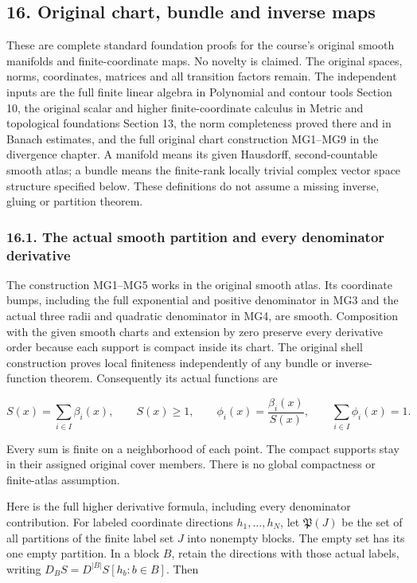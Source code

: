 \documentclass[
  11pt,
]{article}
\begin{document}
\subsection{16. Original chart, bundle and inverse
maps}\label{original-chart-bundle-and-inverse-maps}

These are complete standard foundation proofs for the course's original
smooth manifolds and finite-coordinate maps. No novelty is claimed. The
original spaces, norms, coordinates, matrices and all transition factors
remain. The independent inputs are the full finite linear algebra in
Polynomial and contour tools Section 10, the original scalar and higher
finite-coordinate calculus in Metric and topological foundations Section
13, the norm completeness proved there and in Banach estimates, and the
full original chart construction MG1--MG9 in the divergence chapter. A
manifold means its given Hausdorff, second-countable smooth atlas; a
bundle means the finite-rank locally trivial complex vector space
structure specified below. These definitions do not assume a missing
inverse, gluing or partition theorem.

\subsubsection{16.1. The actual smooth partition and every denominator
derivative}\label{the-actual-smooth-partition-and-every-denominator-derivative}

The construction MG1--MG5 works in the original smooth atlas. Its
coordinate bumps, including the full exponential and positive
denominator in MG3 and the actual three radii and quadratic denominator
in MG4, are smooth. Composition with the given smooth charts and
extension by zero preserve every derivative order because each support
is compact inside its chart. The original shell construction proves
local finiteness independently of any bundle or inverse-function
theorem. Consequently its actual functions are

\[
 S(x)=\sum_{i\in I}\beta_i(x),\qquad S(x)\geq1,\qquad
 \phi_i(x)=\frac{\beta_i(x)}{S(x)},\qquad
 \sum_{i\in I}\phi_i(x)=1 .
 \tag{BG1}
\]

Every sum is finite on a neighborhood of each point. The compact
supports stay in their assigned original cover members. There is no
global compactness or finite-atlas assumption.

Here is the full higher derivative formula, including every denominator
contribution. For labeled coordinate directions \(h_1,\ldots,h_N\), let
\(\mathfrak P(J)\) be the set of all partitions of the finite label set
\(J\) into nonempty blocks. The empty set has its one empty partition.
In a block \(B\), retain the directions with those actual labels,
writing \(D_B S=D^{|B|}S[h_b:b\in B]\). Then
\end{document}
